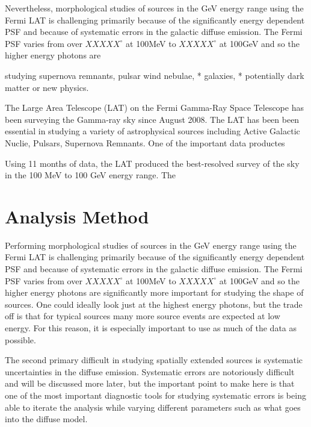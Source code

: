 \documentclass{emulateapj}
\begin{document}
Nevertheless, morphological studies of sources in the GeV energy range using
the Fermi LAT is challenging primarily because of the significantly energy
dependent PSF and because of systematic errors in the
galactic diffuse emission. The Fermi PSF varies from over $XXXXX^\circ$
at 100MeV to $XXXXX^\circ$ at 100GeV and so the higher energy photons are

studying supernova remnants, 
pulsar wind nebulae, 
 * galaxies,  
 * potentially dark matter or new physics.

The Large Area Telescope (LAT) on the Fermi Gamma-Ray Space Telescope
has been surveying the Gamma-ray sky since August 2008. The LAT has been
been essential in studying a variety of astrophysical sources including
Active Galactic Nuclie, Pulsars, Supernova Remnants. 
One of the important data productes 

Using 11 months of data, the LAT produced the best-resolved survey of the sky
in the 100 MeV to 100 GeV energy range\cite{2FGL Paper}. The


\section{Analysis Method}


%

Performing morphological studies of sources in the GeV energy range using
the Fermi LAT is challenging primarily because of the significantly energy
dependent PSF and because of systematic errors in the
galactic diffuse emission. The Fermi PSF varies from over $XXXXX^\circ$
at 100MeV to $XXXXX^\circ$ at 100GeV and so the higher energy photons are
significantly more important for studying the shape of sources. One could
ideally look just at the highest energy photons, but the trade off is that
for typical sources many more source events are expected at low energy.
For this reason, it is especially important to use as much of the data
as possible.

The second primary difficult in studying spatially extended sources is
systematic uncertainties in the diffuse emission. Systematic errors are
notoriously difficult and will be discussed more later, but the important
point to make here is that one of the most important diagnostic tools for
studying systematic errors is being able to iterate the analysis while
varying different parameters such as what goes into the diffuse model.
\end{document}
